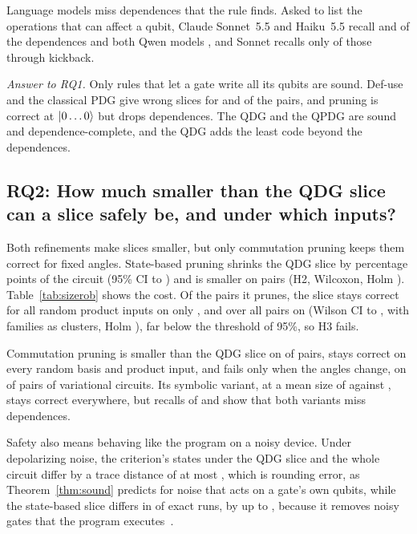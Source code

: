 Language models miss dependences that the rule finds. Asked to list the operations that can affect a qubit, Claude
Sonnet~5.5 and Haiku~5.5 recall \numTOneSonnetRecall{} and \numTOneHaikuRecall{} of the dependences and both Qwen
models \numTOneQwenMidRecall{}, and Sonnet recalls only \numTOneSonnetKick{} of those through kickback.

\emph{Answer to RQ1.} Only rules that let a gate write all its qubits are sound. Def-use and the classical PDG give
wrong slices for \numRqOneDuUnsound{} and \numCpdgUnsound{} of the \numNPairs{} pairs, and pruning is correct at
$\lvert 0\dots0\rangle$ but drops dependences. The QDG and the QPDG are sound and dependence-complete, and the QDG adds the
least code beyond the dependences.

\subsection{RQ2: How much smaller than the QDG slice can a slice safely be, and under which inputs?}

Both refinements make slices smaller, but only commutation pruning keeps them correct for fixed angles. State-based
pruning shrinks the QDG slice by \numHTwoDiff{} percentage points of the circuit (95\% CI \numHTwoCILow{} to
\numHTwoCIHigh{}) and is smaller on \numHTwoSmaller{} pairs (H2, Wilcoxon, Holm \numHTwoPHolm{}).
Table~\ref{tab:sizerob} shows the cost. Of the pairs it prunes, the slice stays correct for all random product inputs
on only \numHThreePrunedRate{}, and over all pairs on \numHThreeRate{} (Wilson CI \numHThreeCILow{} to
\numHThreeCIHigh{}, \numCcHThree{} with families as clusters, Holm \numHThreePHolm{}), far below the threshold of
95\%, so H3 fails.

Commutation pruning is smaller than the QDG slice on \numLcqSmallerThanLc{} of \numLcqApplicable{} pairs, stays
correct on every random basis and product input, and fails only when the angles change, on \numRobLcqParamFail{} of
\numRobLcqParamN{} pairs of variational circuits. Its symbolic variant, at a mean size of \numLcqsSize{} against
\numLcqSize{}, stays correct everywhere, but recalls of \numLcqRecall{} and \numLcqsRecall{} show that both variants
miss dependences.

Safety also means behaving like the program on a noisy device. Under depolarizing noise, the criterion's states under the QDG slice and the whole circuit differ by a trace distance
of at most \numNoiseLcCrossExactMax{}, which is rounding error, as Theorem~\ref{thm:sound} predicts for noise that
acts on a gate's own qubits, while the state-based slice differs in \numNoiseQCrossExactNonzero{} of \numNoiseQCrossExactN{} exact runs, by up to
\numNoiseQCrossExactMax{}, because it removes noisy gates that the program executes~\cite{preskill2018nisq}.

